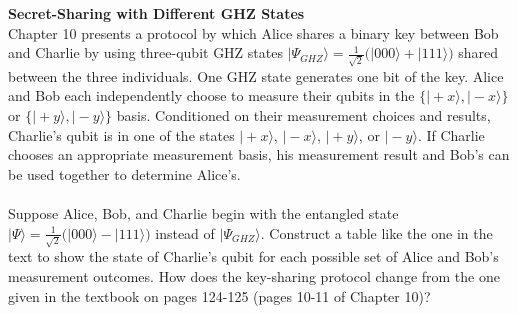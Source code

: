 \documentclass[10pt,letterpaper,boxed,cm]{hmcpset}
\newcommand{\ket}[1]{\big\lvert #1\big\rangle}
\begin{document}
\begin{problem}[3.]
    \textbf{Secret-Sharing with Different GHZ States}\\
    Chapter 10 presents a protocol by which Alice shares a binary key between Bob and Charlie by using three-qubit GHZ states $\ket{\Psi_{GHZ}} = \frac{1}{\sqrt{2}}\bigl(\ket{000}+\ket{111}\bigr)$ shared between the three individuals.  One GHZ state generates one bit of the key.  Alice and Bob each independently choose to measure their qubits in the $\{\ket{+x},\ket{-x}\}$ or $\{\ket{+y},\ket{-y}\}$ basis.  Conditioned on their measurement choices and results, Charlie's qubit is in one of the states $\ket{+x}$, $\ket{-x}$, $\ket{+y}$, or $\ket{-y}$.  If Charlie chooses an appropriate measurement basis, his measurement result and Bob's can be used together to determine Alice's.
    \\
    \\
    Suppose Alice, Bob, and Charlie begin with the entangled state $\ket{\Psi} = \frac{1}{\sqrt{2}}\bigl(\ket{000}-\ket{111}\bigr)$ instead of $\ket{\Psi_{GHZ}}$.  Construct a table like the one in the text to show the state of Charlie's qubit for each possible set of Alice and Bob's measurement outcomes.  How does the key-sharing protocol change from the one given in the textbook on pages 124-125 (pages 10-11 of Chapter 10)?
\end{problem}

\begin{solution}
    \vfill
\end{solution}
\newpage
\end{document}
